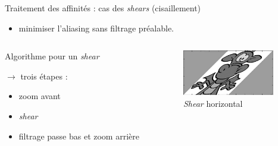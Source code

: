 \documentclass[c,12pt]{beamer}
\newcommand{\ra}[0]{\rightarrow}
\begin{document}
\begin{frame}{Traitement des affinités : cas des \emph{shears} (cisaillement)}

\begin{itemize}
\item minimiser l'aliasing sans filtrage préalable.
\end{itemize}

\begin{columns}
\begin{column}{5cm}

\begin{block}{Algorithme pour un \emph{shear}}

$\ra$ trois étapes :

\begin{itemize}
\item zoom avant
\item \emph{shear}
\item filtrage passe bas et zoom arrière
\end{itemize}

\end{block}
  
 \end{column}

\begin{column}{5cm}

\begin{figure}
\centering
\includegraphics[width=4cm]{dragonshear.jpg}
\caption{\emph{Shear} horizontal}
\end{figure}

\end{column}
\end{columns}
\end{frame}
\end{document}
